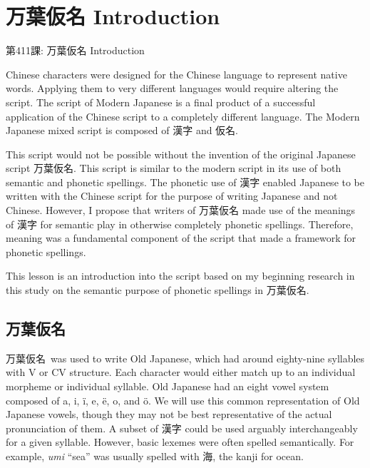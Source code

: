     
\chapter{万葉仮名 Introduction}

\begin{center}
\begin{Large}
第411課: 万葉仮名 Introduction 
\end{Large}
\end{center}
 
\par{ Chinese characters were designed for the Chinese language to represent native words. Applying them to very different languages would require altering the script. The script of Modern Japanese is a final product of a successful application of the Chinese script to a completely different language. The Modern Japanese mixed script is composed of 漢字 and 仮名. }

\par{ This script would not be possible without the invention of the original Japanese script 万葉仮名. This script is similar to the modern script in its use of both semantic and phonetic spellings. The phonetic use of 漢字 enabled Japanese to be written with the Chinese script for the purpose of writing Japanese and not Chinese. However, I propose that writers of 万葉仮名 made use of the meanings of 漢字 for semantic play in otherwise completely phonetic spellings. Therefore, meaning was a fundamental component of the script that made a framework for phonetic spellings. }

\par{ This lesson is an introduction into the script based on my beginning research in this study on the semantic purpose of phonetic spellings in 万葉仮名. }
      
\section{万葉仮名}
 
\par{ 万葉仮名 was used to write Old Japanese, which had around eighty-nine syllables with V or CV structure. Each character would either match up to an individual morpheme or individual syllable. Old Japanese had an eight vowel system composed of a, i, ï, e, ë, o, and ö. We will use this common representation of Old Japanese vowels, though they may not be best representative of the actual pronunciation of them. A subset of 漢字 could be used arguably interchangeably for a given syllable. However, basic lexemes were often spelled semantically. For example, \emph{umi }“sea” was usually spelled with 海, the kanji for ocean. }


